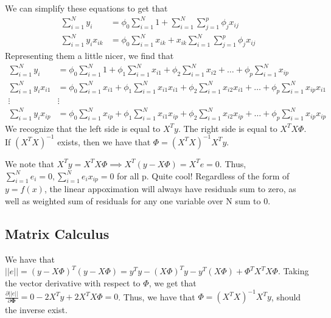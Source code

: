\documentclass{article}
\begin{document}
We can simplify these equations to get that \begin{align*}
    \sum_{i=1}^N y_i &= \phi_0 \sum_{i=1}^N 1  + \sum_{i=1}^N \sum_{j=1}^p \phi_jx_{ij}\\
    \sum_{i=1}^N y_ix_{ik} &= \phi_0 \sum_{i=1}^N x_{ik} + x_{ik}\sum_{i=1}^N \sum_{j=1}^p \phi_jx_{ij}
\end{align*}
Representing them a little nicer, we find that \begin{align*}
    \sum_{i=1}^N y_i &= \phi_0 \sum_{i=1}^N 1  + \phi_1 \sum_{i=1}^N x_{i1} + \phi_2\sum_{i=1}^N x_{i2} + \hdots + \phi_p \sum_{i=1}^N x_{ip} \\
    \sum_{i=1}^N y_i x_{i1} &= \phi_0 \sum_{i=1}^N x_{i1} + \phi_1 \sum_{i=1}^N x_{i1} x_{i1} + \phi_2 \sum_{i=1}^N x_{i2} x_{i1}  + \hdots + \phi_p \sum_{i=1}^N x_{ip}x_{i1} \\
    \vdots & \vdots \\
    \sum_{i=1}^N y_i x_{ip} &= \phi_0 \sum_{i=1}^N x_{ip} + \phi_1 \sum_{i=1}^N x_{i1} x_{ip} + \phi_2 \sum_{i=1}^N x_{i2} x_{ip}  + \hdots + \phi_p \sum_{i=1}^N x_{ip}x_{ip} 
\end{align*}
We recognize that the left side is equal to $X^Ty$. The right side is equal to $X^TX\Phi$. If $(X^TX)^{-1}$ exists, then
we have that $\Phi = (X^TX)^{-1}X^Ty$.

We note that $X^Ty = X^TX\Phi \implies X^T(y - X\Phi) = X^Te = 0$. Thus, 
$\sum_{i=1}^N e_i = 0, \sum_{i=1}^N e_i x_{ip} = 0$ for all p. Quite cool!
Regardless of the form of $y = f(x)$, the linear appoximation will always have
residuals sum to zero, as well as weighted sum of residuals for any one variable over N sum to 0. 

\subsection{Matrix Calculus}
We have that $||e|| = (y - X\Phi)^T(y - X\Phi) = y^Ty - (X\Phi)^Ty - y^T(X\Phi) + \Phi^TX^TX\Phi$. Taking the vector derivative with respect to $\Phi$,
we get that $\frac{\partial||e||}{\partial \mathbf{\Phi}} = 0 - 2X^Ty + 2X^TX\Phi = 0$. Thus, 
we have that $\Phi = (X^TX)^{-1}X^Ty$, should the inverse exist.
\end{document}
